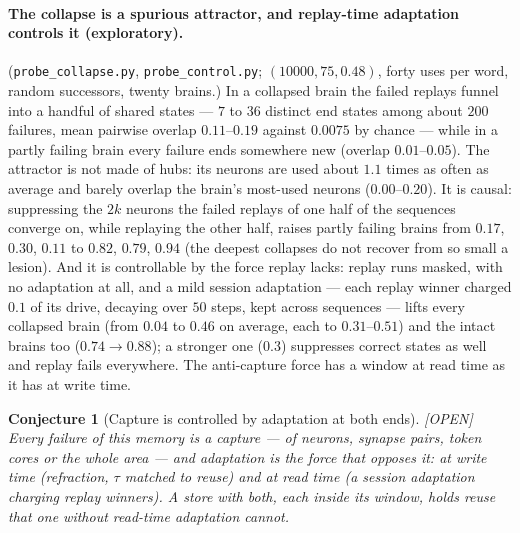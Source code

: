 \documentclass[11pt]{article}
\theoremstyle{definition}
\theoremstyle{plain}
\newtheorem{conjecture}[lemma]{Conjecture}
\newcommand{\OPEN}{\textnormal{\footnotesize\textsf{[OPEN]}}}
\begin{document}
\paragraph{The collapse is a spurious attractor, and replay-time adaptation
controls it (exploratory).} (\texttt{probe\_collapse.py},
\texttt{probe\_control.py}; $(10000,75,0.48)$, forty uses per word, random
successors, twenty brains.) In a collapsed brain the failed replays funnel into
a handful of shared states --- $7$ to $36$ distinct end states among about $200$
failures, mean pairwise overlap $0.11$--$0.19$ against $0.0075$ by chance ---
while in a partly failing brain every failure ends somewhere new (overlap
$0.01$--$0.05$). The attractor is not made of hubs: its neurons are used about
$1.1$ times as often as average and barely overlap the brain's most-used
neurons ($0.00$--$0.20$). It is causal: suppressing the $2k$ neurons the failed
replays of one half of the sequences converge on, while replaying the other
half, raises partly failing brains from $0.17$, $0.30$, $0.11$ to $0.82$, $0.79$,
$0.94$ (the deepest collapses do not recover from so small a lesion). And it is
controllable by the force replay lacks: replay runs masked, with no adaptation
at all, and a mild session adaptation --- each replay winner charged $0.1$ of
its drive, decaying over $50$ steps, kept across sequences --- lifts every
collapsed brain (from $0.04$ to $0.46$ on average, each to $0.31$--$0.51$) and
the intact brains too ($0.74 \to 0.88$); a stronger one ($0.3$) suppresses
correct states as well and replay fails everywhere. The anti-capture force has
a window at read time as it has at write time.

\begin{conjecture}[Capture is controlled by adaptation at both ends]\label{conj:readcontrol} \OPEN
Every failure of this memory is a capture --- of neurons, synapse pairs, token
cores or the whole area --- and adaptation is the force that opposes it: at
write time (refraction, $\tau$ matched to reuse) and at read time (a session
adaptation charging replay winners). A store with both, each inside its
window, holds reuse that one without read-time adaptation cannot.
\end{conjecture}
\end{document}
